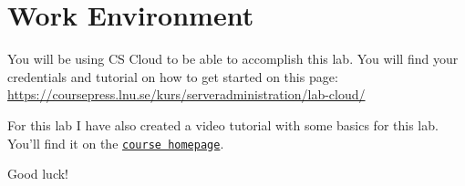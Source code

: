 \documentclass[paper=a4, fontsize=11pt]{report} %
\begin{document}
\section{Work Environment}
\label{environment}

You will be using CS Cloud to be able to accomplish this lab. You will find your credentials and tutorial on how to get started on this page: \href{https://coursepress.lnu.se/kurs/serveradministration/lab-cloud/}{https://coursepress.lnu.se/kurs/serveradministration/lab-cloud/}

For this lab I have also created a video tutorial with some basics for this lab. You'll find it on the \texttt{\href{https://coursepress.lnu.se/kurs/serveradministration/moduler/module-3/laboration}{course homepage}}.

Good luck!
\end{document}

